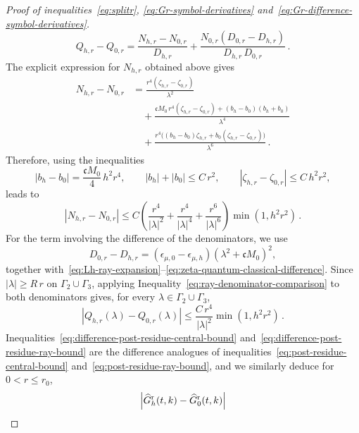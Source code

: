 \documentclass[a4paper,12pt]{amsart} %
\theoremstyle{plain}
\theoremstyle{definition}
\newcommand		{\lt}			{\left}				%
\newcommand		{\rt}			{\right}			%
\renewcommand	{\(}			{\lt(}
\renewcommand	{\)}			{\rt)}
\newcommand		{\n}[1]			{\lt\lvert{#1}\rt\rvert}	%
\renewcommand		{\d}		{\mathop{}\!\mathrm{d}}		%
\newcommand	{\h}			{h}
\newcommand		{\CK}			{\mathfrak{c}}	%
\newcommand		{\hatG}			{\widehat{G}}
\newcommand		{\hatGr}		{\hatG^{\textnormal{r}}}
\begin{document}
\begin{proof}[Proof of inequalities~\eqref{eq:splitr}, \eqref{eq:Gr-symbol-derivatives} and~\eqref{eq:Gr-difference-symbol-derivatives}]
\begin{equation*}
			Q_{\h,r}-Q_{0,r} = \frac{N_{\h,r}-N_{0,r}}{D_{\h,r}} + \frac{N_{0,r} \lt(D_{0,r}-D_{\h,r}\rt)}{D_{\h,r} \, D_{0,r}} \, .
		\end{equation*}
		The explicit expression for $N_{\h,r}$ obtained above gives
		\begin{align*}
			N_{\h,r}-N_{0,r}
			&=\frac{r^4 \lt(\zeta_{\h,r}-\zeta_{0,r}\rt)}{\lambda^2}
			\\
			&\quad + \frac{\CK M_0 \, r^4 \lt(\zeta_{\h,r}-\zeta_{0,r}\rt)
			+ \lt(b_\h-b_0\rt) \lt(b_\h+b_0\rt)}{\lambda^4}
			\\
			&\quad + \frac{r^4\bigl(\lt(b_\h-b_0\rt)\zeta_{\h,r}
			+b_0 \lt(\zeta_{\h,r}-\zeta_{0,r}\rt)\bigr)}{\lambda^6} \, .
		\end{align*}
		Therefore, using the inequalities
		\begin{equation*}
			\n{b_\h-b_0} = \frac{\CK M_0}{4} \, h^2 r^4 ,
			\qquad \n{b_\h}+ \n{b_0} \leq C \, r^2 ,
			\qquad \n{\zeta_{\h,r}-\zeta_{0,r}} \leq C \, h^2 r^2 ,
		\end{equation*}
		leads to
		\begin{equation}\label{eq:Nh-quantum-classical-difference}
			\n{N_{\h,r}-N_{0,r}} \leq C \left(\frac{r^4}{\n{\lambda}^2} + \frac{r^4}{\n{\lambda}^4} + \frac{r^6}{\n{\lambda}^6}\right) \min(1,h^2r^2) \, .
		\end{equation}
		For the term involving the difference of the denominators, we use
		\begin{equation*}
			D_{0,r}-D_{\h,r} = \lt(\epsilon_{\mu,0}-\epsilon_{\mu,\h}\rt) \lt(\lambda^2+\CK M_0\rt)^2,
		\end{equation*}
		together with~\eqref{eq:Lh-ray-expansion}--\eqref{eq:zeta-quantum-classical-difference}. Since $\n{\lambda}\geq R\, r$ on $\Gamma_2\cup\Gamma_3$, applying
		Inequality~\eqref{eq:ray-denominator-comparison} to both denominators
		gives, for every $\lambda\in\Gamma_2\cup\Gamma_3$,
		\begin{equation}\label{eq:difference-post-residue-ray-bound}
			\n{Q_{\h,r}(\lambda) - Q_{0,r}(\lambda)} \leq \frac{C\,r^4}{\n{\lambda}^2} \min(1, h^2r^2) \, .
		\end{equation}
		Inequalities~\eqref{eq:difference-post-residue-central-bound} and~\eqref{eq:difference-post-residue-ray-bound} are the difference analogues of inequalities~\eqref{eq:post-residue-central-bound} and~\eqref{eq:post-residue-ray-bound}, and we similarly deduce for $0<r\leq r_0$,
		\begin{equation*}
			\n{\hatGr_\h(t,k)-\hatGr_0(t,k)}

\end{equation*}
\end{proof}
\end{document}

